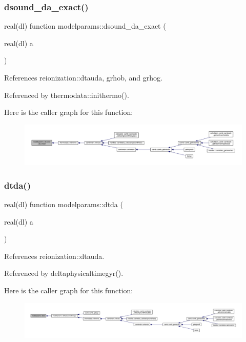 \subsubsection{\texorpdfstring{dsound\+\_\+da\+\_\+exact()}{dsound\_da\_exact()}}
{\footnotesize\ttfamily real(dl) function modelparams\+::dsound\+\_\+da\+\_\+exact (\begin{DoxyParamCaption}\item[{real(dl)}]{a }\end{DoxyParamCaption})}



References reionization\+::dtauda, grhob, and grhog.



Referenced by thermodata\+::inithermo().

Here is the caller graph for this function\+:
\nopagebreak
\begin{figure}[H]
\begin{center}
\leavevmode
\includegraphics[width=350pt]{namespacemodelparams_a57d61799939e1d3d5984dba316f8cc6a_icgraph}
\end{center}
\end{figure}
\mbox{\label{namespacemodelparams_a0ab3d80c1ede505b3412f5b33bd3a202}} 
\subsubsection{\texorpdfstring{dtda()}{dtda()}}
{\footnotesize\ttfamily real(dl) function modelparams\+::dtda (\begin{DoxyParamCaption}\item[{real(dl)}]{a }\end{DoxyParamCaption})}



References reionization\+::dtauda.



Referenced by deltaphysicaltimegyr().

Here is the caller graph for this function\+:
\nopagebreak
\begin{figure}[H]
\begin{center}
\leavevmode
\includegraphics[width=350pt]{namespacemodelparams_a0ab3d80c1ede505b3412f5b33bd3a202_icgraph}
\end{center}
\end{figure}
\mbox{\label{namespacemodelparams_ad0ec1bb07f7e0295749e801b141bfc0f}} 
